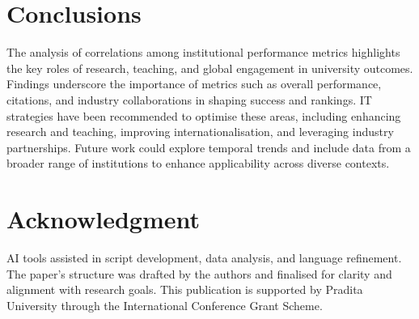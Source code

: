 \documentclass[conference]{IEEEtran}
\begin{document}
\section{Conclusions}

The analysis of correlations among institutional performance metrics highlights the key roles of research, teaching, and global engagement in university outcomes. Findings underscore the importance of metrics such as overall performance, citations, and industry collaborations in shaping success and rankings. IT strategies have been recommended to optimise these areas, including enhancing research and teaching, improving internationalisation, and leveraging industry partnerships. Future work could explore temporal trends and include data from a broader range of institutions to enhance applicability across diverse contexts.

\section*{Acknowledgment}
AI tools assisted in script development, data analysis, and language refinement. The paper’s structure was drafted by the authors and finalised for clarity and alignment with research goals. This publication is supported by Pradita University through the International Conference Grant Scheme.




\end{document}
